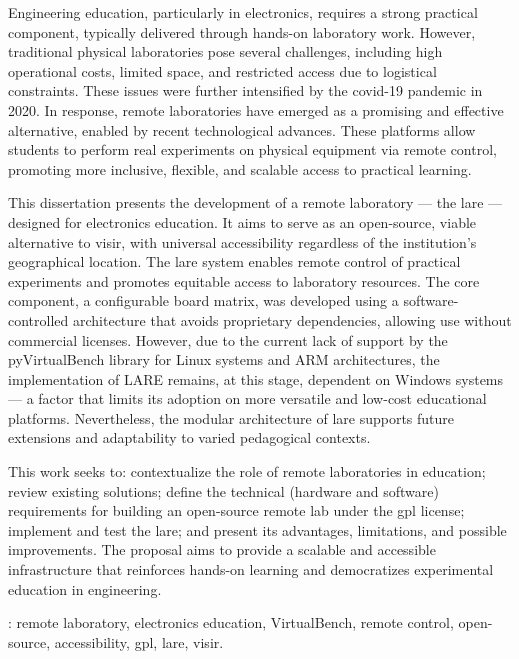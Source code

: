 \begin{secondlangabstract}

Engineering education, particularly in electronics, requires a strong practical component, typically delivered through hands-on laboratory work. However, traditional physical laboratories pose several challenges, including high operational costs, limited space, and restricted access due to logistical constraints. These issues were further intensified by the \acrshort{covid-19} pandemic in 2020. In response, remote laboratories have emerged as a promising and effective alternative, enabled by recent technological advances. These platforms allow students to perform real experiments on physical equipment via remote control, promoting more inclusive, flexible, and scalable access to practical learning.

This dissertation presents the development of a remote laboratory — the \acrfull{lare} — designed for electronics education. It aims to serve as an open-source, viable alternative to \acrshort{visir}, with universal accessibility regardless of the institution’s geographical location. The \acrshort{lare} system enables remote control of practical experiments and promotes equitable access to laboratory resources. The core component, a configurable board matrix, was developed using a software-controlled architecture that avoids proprietary dependencies, allowing use without commercial licenses. However, due to the current lack of support by the pyVirtualBench library for Linux systems and ARM architectures, the implementation of LARE remains, at this stage, dependent on Windows systems — a factor that limits its adoption on more versatile and low-cost educational platforms. Nevertheless, the modular architecture of \acrshort{lare} supports future extensions and adaptability to varied pedagogical contexts.

This work seeks to: contextualize the role of remote laboratories in education; review existing solutions; define the technical (hardware and software) requirements for building an open-source remote lab under the \acrshort{gpl} license; implement and test the \acrshort{lare}; and present its advantages, limitations, and possible improvements. The proposal aims to provide a scalable and accessible infrastructure that reinforces hands-on learning and democratizes experimental education in engineering.



\vspace*{10mm} 
\noindent
\textbf{\keywordslabel}: remote laboratory, electronics education, VirtualBench, remote control, open-source, accessibility, \acrshort{gpl}, \acrshort{lare}, \acrshort{visir}.

\end{secondlangabstract}

